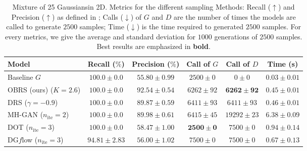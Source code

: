 \documentclass[twoside]{article}
\begin{document}
\begin{table*}[!b]
 \caption{Mixture of 25 Gaussiansin 2D. Metrics for the different sampling Methods: Recall ($\uparrow$) and Precision ($\uparrow$) as defined in \cite{dumoulin_adversarially_2017};  Calls ($\downarrow$) of $G$ and $D$ are the number of times the models are called to generate $2500$ samples; Time ($\downarrow$) is the time required to generated $2500$ samples.
 For every metrics, we give the average and standard deviation for $1000$ generations of $2500$ samples. Best results are emphasized in \textbf{bold}.} \label{tab:2Dexp}
\begin{tabularx}{\textwidth}{X|ccccc}
        Model & Recall ($\%$) & Precision ($\%$) & Call of $G$  & Call of $D$ & Time (s)\\\hline
Baseline $G$ & $100.0 \pm 0.0$ & $55.80 \pm 0.99$ & $2500 \pm 0$ & $0 \pm 0$ & $0.03 \pm 0.01$ \\  \hline\addlinespace[0.1em]
OBRS (ours) ($K = 2.6$) & $100.0 \pm 0.0$ & $\mathbf{92.54 \pm 0.54}$ & $6262 \pm 92$ & $\mathbf{6262 \pm 92}$ & $\mathbf{0.45 \pm 0.01}$ \\
DRS ($\gamma = -0.9$) & $100.0 \pm 0.0$ & $89.87 \pm 0.59$ & $6411 \pm 93$ & $6411 \pm 93$ & $\mathbf{0.46 \pm 0.01}$ \\
MH-GAN ($n_{\mathrm{ite}}=2$) & $100.0 \pm 0.0$ & $89.98 \pm 0.61$ & $6415 \pm 45$ & $19292 \pm 23$ & $6.38 \pm 0.09$ \\
DOT ($n_{\mathrm{ite}}=3$) & $100.0 \pm 0.0$ & $58.47 \pm 1.00$ & $\mathbf{2500 \pm 0}$ & $7500 \pm 0$ & $0.94 \pm 0.14$ \\
DG$f$low ($n_{\mathrm{ite}}=3$) & $94.81 \pm 2.83$ & $56.00 \pm 1.02$ & $7500 \pm 0$ & $7500 \pm 0$ & $0.67 \pm 0.13$ \\ \hline
    \end{tabularx}
\end{table*}
\end{document}
